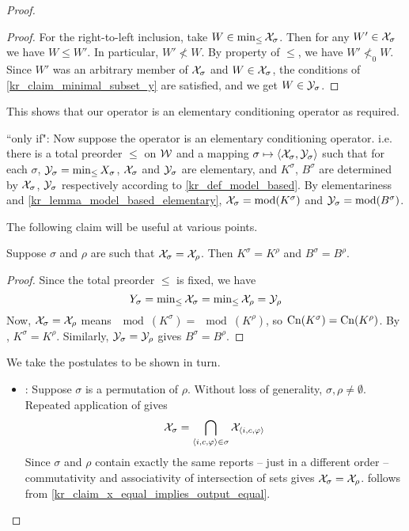 \begin{proof}
\begin{proof}
        For the right-to-left inclusion, take $W \in \min_{\le}{\mathcal{X}_\sigma}$.
        Then for any $W' \in \mathcal{X}_\sigma$ we have $W \le W'$. In particular, $W'
        \not< W$. By property  of $\le$,
        we have $W' \not<_0 W$. Since $W'$ was an arbitrary member of
        $\mathcal{X}_\sigma$ and $W \in \mathcal{X}_\sigma$, the conditions of
        \cref{kr_claim_minimal_subset_y} are satisfied, and we get $W \in
        \mathcal{Y}_\sigma$.
    \end{proof}

This shows that our operator is an elementary conditioning operator as
required.

``only if": Now  suppose the operator is an elementary conditioning operator.
i.e. there is a total preorder $\le$ on $\mathcal{W}$ and a mapping $\sigma \mapsto
\langle {\mathcal{X}_\sigma, \mathcal{Y}_\sigma} \rangle$ such that for each $\sigma$, $\mathcal{Y}_\sigma =
\min_{\le}{X_\sigma}$, $\mathcal{X}_\sigma$ and $\mathcal{Y}_\sigma$ are elementary, and
$K^\sigma$, $B^\sigma$ are determined by $\mathcal{X}_\sigma$, $\mathcal{Y}_\sigma$ respectively
according to \cref{kr_def_model_based}. By elementariness and
\cref{kr_lemma_model_based_elementary}, $\mathcal{X}_\sigma = \operatorname{mod}(K^\sigma)$ and $\mathcal{Y}_\sigma
= \operatorname{mod}(B^\sigma)$.

The following claim will be useful at various points.

    \begin{claim}
        \label{kr_claim_x_equal_implies_output_equal}
        Suppose $\sigma$ and $\rho$ are such that $\mathcal{X}_\sigma = \mathcal{X}_\rho$. Then
        $K^\sigma = K^\rho$ and $B^\sigma = B^\rho$.
    \end{claim}
    \begin{proof}
        Since the total preorder $\le$ is fixed, we have
        \[
            Y_\sigma
            = \min\nolimits_{\le}{\mathcal{X}_\sigma}
            = \min\nolimits_{\le}{\mathcal{X}_\rho}
            = \mathcal{Y}_\rho
        \]
        Now, $\mathcal{X}_\sigma = \mathcal{X}_\rho$ means $\mod(K^\sigma) = \mod(K^\rho)$, so
        $\operatorname{Cn}(K^\sigma) = \operatorname{Cn}(K^\rho)$. By \closure{}, $K^\sigma = K^\rho$.
        Similarly, $\mathcal{Y}_\sigma = \mathcal{Y}_\rho$ gives $B^\sigma = B^\rho$.
    \end{proof}

We take the postulates to be shown in turn.

\begin{itemize}
    \item \rearr{}: Suppose $\sigma$ is a permutation of $\rho$.
          Without loss of generality, $\sigma, \rho \ne \emptyset$. Repeated
          application of \kconj{} gives
          \[
            \mathcal{X}_{\sigma} = \bigcap_{\langle {i, c, \varphi} \rangle \in \sigma}{\mathcal{X}_{\langle {i,
            c, \varphi} \rangle}}
          \]
          Since $\sigma$ and $\rho$ contain exactly the same reports -- just in
          a different order -- commutativity and associativity of intersection
          of sets gives $\mathcal{X}_\sigma = \mathcal{X}_\rho$. \rearr{} follows
          from \cref{kr_claim_x_equal_implies_output_equal}.


\end{itemize}
\end{proof}

